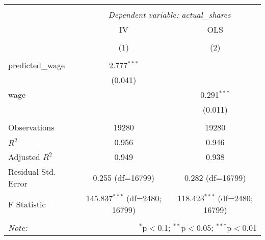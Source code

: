\begin{table}[!htbp] \centering
    \begin{tabular}{@{\extracolsep{5pt}}lcc}
        \\[-1.8ex]\hline
        \hline                                                                                                                        \\[-1.8ex]
                            & \multicolumn{2}{c}{\textit{Dependent variable: actual\_shares}} \
        \cr \cline{2-3}
        \\[-1.8ex] & \multicolumn{1}{c}{IV} & \multicolumn{1}{c}{OLS}  \\
        \\[-1.8ex] & (1) & (2) \\
        \hline                                                                                                                        \\[-1.8ex]
        predicted\_wage     & 2.777$^{***}$                                                        &                                  \\
                            & (0.041)                                                              &                                  \\
        wage                &                                                                      & 0.291$^{***}$                    \\
                            &                                                                      & (0.011)                          \\
        \hline                                                                                                                        \\[-1.8ex]
        Observations        & 19280                                                                & 19280                            \\
        $R^2$               & 0.956                                                                & 0.946                            \\
        Adjusted $R^2$      & 0.949                                                                & 0.938                            \\
        Residual Std. Error & 0.255 (df=16799)                                                     & 0.282 (df=16799)                 \\
        F Statistic         & 145.837$^{***}$ (df=2480; 16799)                                     & 118.423$^{***}$ (df=2480; 16799) \\
        \hline
        \hline                                                                                                                        \\[-1.8ex]
        \textit{Note:}      & \multicolumn{2}{r}{$^{*}$p$<$0.1; $^{**}$p$<$0.05; $^{***}$p$<$0.01}                                    \\
    \end{tabular}
\end{table}